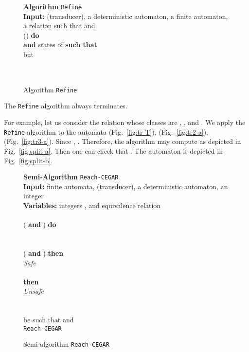 \documentclass[]{llncs}
\def \sp {\hspace*{0.8cm}}
\begin{document}
\begin{figure}[tb]
{\bf Algorithm} {\tt Refine}\\
{\bf Input:}  (transducer),  a deterministic automaton,
 a finite automaton, a relation 
such that  and 
\\
\sp {\bf While} () {\bf do}\\
\sp\sp {\bf Choose}  {\bf and} 
states of  {\bf such that}\\
\sp\sp\sp but
 \\
\sp\sp {\tt Split} \\
\sp {\bf EndWhile}\\ 
\sp {\bf Return} 
\caption{Algorithm {\tt Refine}}\label{algo:raff2}
\end{figure}

\begin{proposition}\label{prop-refine}
  The  {\tt Refine} algorithm always terminates.
\end{proposition}




























For example, let us consider the  relation whose classes are
, , 
and .  We apply the {\tt
  Refine} algorithm to the automata 
(Fig.~\ref{fig:tr-T}),  (Fig.~\ref{fig:tr2-a}),  (Fig.~\ref{fig:tr3-a}).  Since
, . Therefore, the algorithm may compute
 as depicted in
Fig.~\ref{fig:split-a}. Then one can check that
. The automaton  is depicted in
Fig.~\ref{fig:split-b}.




\begin{figure}[tb]
{\bf Semi-Algorithm} {\tt Reach-CEGAR}\\
{\bf Input:}   finite automata,  (transducer),  a
deterministic automaton, an integer~\\
{\bf Variables:} integers , and equivalence relation \\
\sp \\
\sp {\bf While} ( {\bf and}
 ) {\bf do}\\
\sp\sp \\
\sp {\bf EndWhile}\\
\sp {\bf If} ( {\bf and}  ) {\bf then}\\
\sp\sp {\bf Return} {\it Safe}\\
\sp {\bf EndIf}\\
\sp {\bf If}   {\bf then}\\
\sp\sp {\bf Return} {\it Unsafe}\\
\sp{\bf EndIf}\\
\sp \\
\sp {\bf Let}  be such that  and 
\\
\sp {\bf Return}  {\tt Reach-CEGAR}
\caption{Semi-algorithm {\tt Reach-CEGAR}}\label{algo:cegar}
\end{figure}
\end{document}
